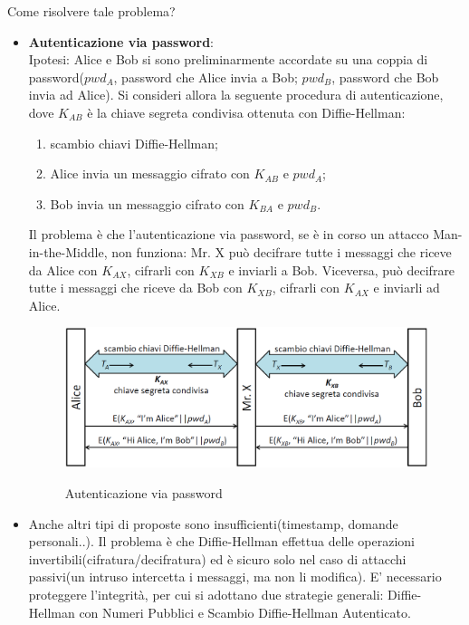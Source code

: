 Come risolvere tale problema? 
\begin{itemize}
\item \textbf{Autenticazione via password}: \\ Ipotesi: Alice e Bob si sono preliminarmente accordate su una coppia di password($pwd_{A}$, password che Alice invia a Bob; $pwd_{B}$, password che Bob invia ad Alice). Si consideri allora la seguente procedura di autenticazione, dove $K_{AB}$ è la chiave segreta condivisa ottenuta con Diffie-Hellman: \begin{enumerate}
\item scambio chiavi Diffie-Hellman;
\item Alice invia un messaggio cifrato con $K_{AB}$ e $pwd_{A}$;
\item Bob invia un messaggio cifrato con $K_{BA}$ e $pwd_{B}$.
\end{enumerate}
Il problema è che l'autenticazione via password, se è in corso un attacco Man-in-the-Middle, non funziona: Mr. X può decifrare tutte i messaggi che riceve da Alice con $K_{AX}$, cifrarli con $K_{XB}$ e inviarli a Bob. Viceversa, può decifrare tutte i messaggi che riceve da Bob con $K_{XB}$, cifrarli con $K_{AX}$ e inviarli ad Alice.
\begin{figure}[htbp]
	\centering%
	\subfigure%
	{\includegraphics[scale=0.5, keepaspectratio]{Immagini/Capitolo6/DiffieHellman_passauth.png}}
	\caption{Autenticazione via password}
	\end{figure}
\item Anche altri tipi di proposte sono insufficienti(timestamp, domande personali..). Il problema è che Diffie-Hellman effettua delle operazioni invertibili(cifratura/decifratura) ed è sicuro solo nel caso di attacchi passivi(un intruso intercetta i messaggi, ma non li modifica). E' necessario proteggere l'integrità, per cui si adottano due strategie generali: Diffie-Hellman con Numeri Pubblici e Scambio Diffie-Hellman Autenticato.	
\end{itemize}

